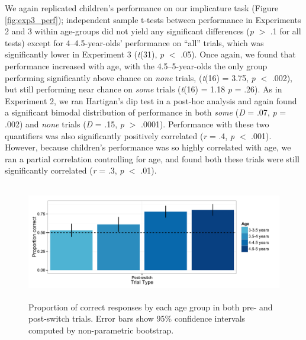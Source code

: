\documentclass[man]{apa2}
\begin{document}
We again replicated children's performance on our implicature task (Figure \ref{fig:exp3_perf}); independent sample t-tests between performance in Experiments 2 and 3 within age-groups did not yield any significant differences (\emph{p} $>$ .1 for all tests) except for 4--4.5-year-olds' performance on ``all'' trials, which was significantly lower in Experiment 3 (\emph{t}(31), \emph{p} $<$ .05). Once again, we found that performance increased with age, with the 4.5--5-year-olds the only group performing significantly above chance on \emph{none} trials, (\emph{t}(16) = 3.75, \emph{p} $<$ .002), but still performing near chance on \textit{some} trials (\emph{t}(16) = 1.18 \emph{p} = .26). As in Experiment 2, we ran Hartigan's dip test in a post-hoc analysis and again found a significant bimodal distribution of performance in both \textit{some} (\textit{D} = .07, \textit{p} = .002) and \textit{none} trials (\textit{D} = .15, \textit{p} $>$ .0001). Performance with these two quantifiers was also significantly positively correlated (\emph{r} = .4, \emph{p} $<$ .001). However, because children's performance was so highly correlated with age, we ran a partial correlation controlling for age, and found both these trials were still significantly correlated (\emph{r} = .3, \emph{p} $<$ .01). 


\begin{figure} 
 \begin{center} 
  \includegraphics[height=2in]{figures/DCCS.pdf} 
  \caption{\label{fig:exp3_DCCS} Proportion of correct responses by each age group in both pre- and post-switch trials.  Error bars show 95\% confidence intervals computed by non-parametric bootstrap.} 
 \end{center} 
\end{figure}
\end{document}
